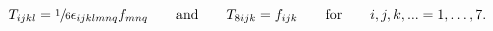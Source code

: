 \begin{equation}\label{eq:oct}
 T_{ijkl}=\sfrac{1}{6}\epsilon_{ijklmnq}f_{mnq}\qquad\text{and}\qquad
 T_{8ijk}=f_{ijk}\qquad\text{for}\qquad i,j,k,...=1,\ldots, 7.
\end{equation}

